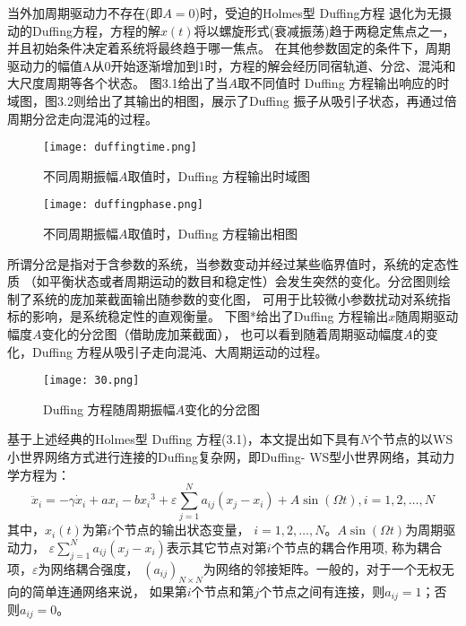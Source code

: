 当外加周期驱动力不存在(即$A=0$)时，受迫的Holmes型 Duffing方程
退化为无摄动的Duffing方程，方程的解$x\left(t\right)$将以螺旋形式(衰减振荡)趋于两稳定焦点之一，并且初始条件决定着系统将最终趋于哪一焦点。
在其他参数固定的条件下，周期驱动力的幅值A从0开始逐渐增加到1时，方程的解会经历同宿轨道、分岔、混沌和大尺度周期等各个状态。
图3.1给出了当$A$取不同值时 Duffing 方程输出响应的时域图，图3.2则给出了其输出的相图，展示了Duffing 振子从吸引子状态，再通过倍周期分岔走向混沌的过程。
 \begin{figure}[!htbp]
    \centering
    \texttt{[image: duffingtime.png]}
    \caption{不同周期振幅$A$取值时，Duffing 方程输出时域图}
 \end{figure}

 \begin{figure}[!htbp]
    \centering
    \texttt{[image: duffingphase.png]}
    \caption{不同周期振幅$A$取值时，Duffing 方程输出相图}
 \end{figure}

所谓分岔是指对于含参数的系统，当参数变动并经过某些临界值时，系统的定态性质
（如平衡状态或者周期运动的数目和稳定性）会发生突然的变化。分岔图则绘制了系统的庞加莱截面输出随参数的变化图，
可用于比较微小参数扰动对系统指标的影响，是系统稳定性的直观衡量。 下图*给出了Duffing 方程输出$x$随周期驱动幅度$A$变化的分岔图（借助庞加莱截面），
也可以看到随着周期驱动幅度$A$的变化，Duffing 方程从吸引子走向混沌、大周期运动的过程。
 \begin{figure}[!htbp]
    \centering
    \texttt{[image: 30.png]}\caption{Duffing 方程随周期振幅$A$变化的分岔图}
 \end{figure}


基于上述经典的Holmes型 Duffing 方程(3.1)，本文提出如下具有$N$个节点的以WS小世界网络方式进行连接的Duffing复杂网，即Duffing- WS型小世界网络，其动力学方程为：
\begin{equation}
    \ddot{x}_{i}=-\gamma \dot{x}_{i}+a x_{i}-b x_{i}{ }^{3}+\varepsilon \sum_{j=1}^{N} a_{i j}\left(x_{j}-x_{i}\right)+A \sin (\Omega t), i=1,2, \ldots, N
\end{equation}
其中，$x_i(t)$为第$i$个节点的输出状态变量， $i=1,2,\ldots,N$。$A\sin(\Omega t)$为周期驱动力， 
$\varepsilon \sum_{j=1}^{N} a_{i j}\left(x_{j}-x_{i}\right)$表示其它节点对第$i$个节点的耦合作用项, 称为耦合项，$\varepsilon$为网络耦合强度，
$\left(a_{ij}\right)_{N\times N}$为网络的邻接矩阵。一般的，对于一个无权无向的简单连通网络来说，
如果第$i$个节点和第$j$个节点之间有连接，则$a_{ij} = 1$；否则$a_{ij} = 0$。

